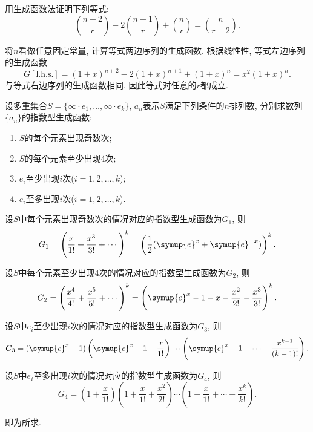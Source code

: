 \documentclass[chinese]{assignment}[2019/10/15]
\newcommand{\me}{\symup{e}}
\newcommand{\lr}[3]{\left#1#3\right#2}
\begin{document}
    \begin{problem}
        用生成函数法证明下列等式:
        \begin{equation}
            \binom{n+2}{r} - 2\binom{n+1}{r} + \binom nr = \binom{n}{r-2}.
        \end{equation}
    \end{problem}
    \begin{solution}
        将$n$看做任意固定常量, 计算等式两边序列的生成函数. 根据线性性, 等式左边序列的生成函数
        \begin{equation}
            G[\text{l.h.s.}] = (1+x)^{n+2} - 2(1+x)^{n+1} + (1+x)^n = x^2(1+x)^n.
        \end{equation}
        与等式右边序列的生成函数相同, 因此等式对任意的$r$都成立.
    \end{solution}

    \begin{problem}
        设多重集合$S=\{\infty\cdot e_1, \dotsc, \infty\cdot e_k\}$, $a_n$表示$S$满足下列条件的$n$排列数, 分别求数列$\{a_n\}$的指数型生成函数:
        \begin{enumerate}[(1)]
            \item $S$的每个元素出现奇数次;
            \item $S$的每个元素至少出现4次;
            \item $e_i$至少出现$i$次($i=1,2,\dotsc, k$);
            \item $e_i$至多出现$i$次($i=1,2,\dotsc, k$).
        \end{enumerate}
    \end{problem}
    \begin{solution}
        设$S$中每个元素出现奇数次的情况对应的指数型生成函数为$G_1$, 则
        \begin{equation}
            G_1 = \left(\frac{x}{1!} + \frac{x^3}{3!} + \dotsb\right)^k = \lr(){\frac{1}{2}(\me^x+\me^{-x})}^k.
        \end{equation}

        设$S$中每个元素至少出现4次的情况对应的指数型生成函数为$G_2$, 则
        \begin{equation}
            G_2 = \lr(){\frac{x^4}{4!}+\frac{x^5}{5!} + \dotsb}^k = \lr(){\me^x-1-x-\frac{x^2}{2!}-\frac{x^3}{3!}}^k.
        \end{equation}

        设$S$中$e_i$至少出现$i$次的情况对应的指数型生成函数为$G_3$, 则
        \begin{equation}
            G_3 = (\me^x - 1)\left(\me^x - 1 - \frac{x}{1!}\right)\dotsb\left(\me^x-1-\dotsb-\frac{x^{k-1}}{(k-1)!}\right).
        \end{equation}

        设$S$中$e_i$至多出现$i$次的情况对应的指数型生成函数为$G_4$, 则
        \begin{equation}
            G_4 = \lr(){1+\frac{x}{1!}}\lr(){1+\frac{x}{1!}+\frac{x^2}{2!}}\dotsb\lr(){1+\frac{x}{1!}+\dotsb +\frac{x^k}{k!}}.
        \end{equation}

        即为所求.
    \end{solution}
\end{document}
